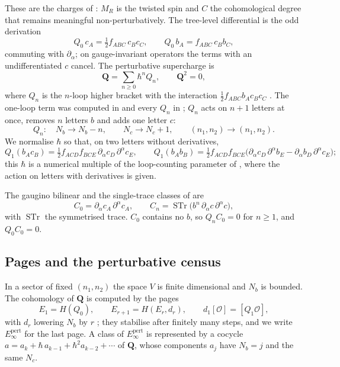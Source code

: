 \documentclass[11pt]{article}
\numberwithin{equation}{section}
\numberwithin{figure}{section}
\numberwithin{table}{section}
\theoremstyle{definition}
\newcommand{\Qp}{\mathbf Q}
\newcommand{\Ep}{E_\infty^{\mathrm{pert}}}
\begin{document}
These are the charges of \cite[Table~1]{semichiral}: $M_R$ is the twisted spin and $C$ the cohomological degree that remains meaningful non-perturbatively. The tree-level differential is the odd derivation
\begin{equation}\label{eq-Q0}
Q_0\,c_A=\tfrac12f_{ABC}\,c_Bc_C,\qquad Q_0\,b_A=f_{ABC}\,c_Bb_C,
\end{equation}
commuting with $\partial_\alpha$; on gauge-invariant operators the terms with an undifferentiated $c$ cancel. The perturbative supercharge is
\begin{equation}\label{eq-Qpert}
\Qp=\sum_{n\ge0}\hbar^nQ_n,\qquad \Qp^2=0,
\end{equation}
where $Q_n$ is the $n$-loop higher bracket with the interaction $\tfrac12f_{ABC}b_Ac_Bc_C$ \cite[Equation~(3.10)]{LLCh}. The one-loop term was computed in \cite{BK} and every $Q_n$ in \cite{LLCh}; $Q_n$ acts on $n+1$ letters at once, removes $n$ letters $b$ and adds one letter $c$:
\begin{equation}\label{eq-Qn-degrees}
Q_n:\quad N_b\to N_b-n,\qquad N_c\to N_c+1,\qquad (n_1,n_2)\to(n_1,n_2).
\end{equation}
We normalise $\hbar$ so that, on two letters without derivatives,
\begin{equation}\label{eq-Q1}
Q_1(b_Ac_B)=\tfrac12f_{ACD}f_{BCE}\,\partial_\alpha c_D\,\partial^\alpha c_E,\qquad
Q_1(b_Ab_B)=\tfrac12f_{ACD}f_{BCE}\big(\partial_\alpha c_D\,\partial^\alpha b_E-\partial_\alpha b_D\,\partial^\alpha c_E\big);
\end{equation}
this $\hbar$ is a numerical multiple of the loop-counting parameter of \cite[Equation~(6.1)]{LLCh}, where the action on letters with derivatives is given.

The gaugino bilinear and the single-trace classes of \cite[Section~3.1]{semichiral} are
\begin{equation}\label{eq-C0}
C_0=\partial_\alpha c_A\,\partial^\alpha c_A,\qquad C_n=\operatorname{STr}\big(b^n\,\partial_\alpha c\,\partial^\alpha c\big),
\end{equation}
with $\operatorname{STr}$ the symmetrised trace. $C_0$ contains no $b$, so $Q_nC_0=0$ for $n\ge1$, and $Q_0C_0=0$.

\subsection{Pages and the perturbative census}\label{sec-census}

In a sector of fixed $(n_1,n_2)$ the space $V$ is finite dimensional and $N_b$ is bounded. The cohomology of $\Qp$ is computed by the pages
\begin{equation}\label{eq-pages}
E_1=H(Q_0),\qquad E_{r+1}=H(E_r,d_r),\qquad d_1[\mathcal O]=[Q_1\mathcal O],
\end{equation}
with $d_r$ lowering $N_b$ by $r$ \cite[Section~9.3]{LLCh}; they stabilise after finitely many steps, and we write $\Ep$ for the last page. A class of $\Ep$ is represented by a cocycle $a=a_k+\hbar\,a_{k-1}+\hbar^2a_{k-2}+\cdots$ of $\Qp$, whose components $a_j$ have $N_b=j$ and the same $N_c$.
\end{document}
